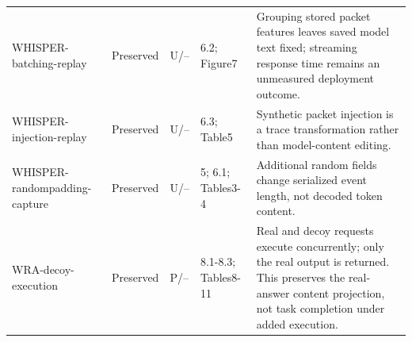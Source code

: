 \begin{longtable}{@{}p{}p{}p{}p{}p{}@{}}
WHISPER-\allowbreak{}batching-\allowbreak{}replay~\cite{whisperleak2025} & Preserved & U/-- & 6.2; Figure7 & Grouping stored packet features leaves saved model text fixed; streaming response time remains an unmeasured deployment outcome.\\
WHISPER-\allowbreak{}injection-\allowbreak{}replay~\cite{whisperleak2025} & Preserved & U/-- & 6.3; Table5 & Synthetic packet injection is a trace transformation rather than model-content editing.\\
WHISPER-\allowbreak{}randompadding-\allowbreak{}capture~\cite{whisperleak2025} & Preserved & U/-- & 5; 6.1; Tables3-4 & Additional random fields change serialized event length, not decoded token content.\\
WRA-\allowbreak{}decoy-\allowbreak{}execution~\cite{jeong2026wra} & Preserved & P/-- & 8.1-8.3; Tables8-11 & Real and decoy requests execute concurrently; only the real output is returned. This preserves the real-answer content projection, not task completion under added execution.\\
\bottomrule\end{longtable}\endgroup
